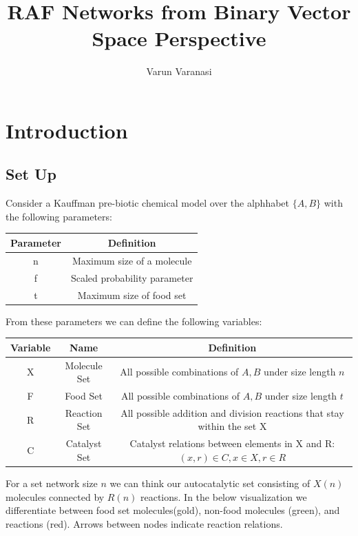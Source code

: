 \documentclass{article}
\begin{document}
\title{RAF Networks from Binary Vector Space Perspective}
\author{Varun Varanasi}
\maketitle

\section{Introduction}

\subsection{Set Up}
Consider a Kauffman pre-biotic chemical model over the alphhabet $\{A,B\}$ with the following parameters:


\begin{center}
\begin{tabular}{ | c || c| } 
  \hline
  \textbf{Parameter} & \textbf{Definition} \\ 
  \hline
  n &  Maximum size of a molecule \\ 
  f &  Scaled probability parameter   \\ 
  t & Maximum size of food set \\ 
  \hline
\end{tabular}
\end{center}

From these parameters we can define the following variables:


\begin{center}
    \begin{tabular}{ | c || c| c|} 
      \hline
      \textbf{Variable} & \textbf{Name }& \textbf{Definition} \\ 
      \hline
      X & Molecule Set &  All possible combinations of $A,B$ under size length $n$ \\ 
      F & Food Set &  All possible combinations of $A,B$ under size length $t$  \\ 
      R & Reaction Set & All possible addition and division reactions that stay within the set X\\ 
      C & Catalyst Set & Catalyst relations between elements in X and R: $(x,r) \in C , x \in X, r \in R$  \\
      \hline
\end{tabular}
\end{center}

For a set network size $n$ we can think our autocatalytic set consisting of $X(n)$ molecules connected by $R(n)$ reactions. 
In the below visualization we differentiate between food set molecules(gold), non-food molecules (green), and reactions (red).
Arrows between nodes indicate reaction relations. 
\end{document}

